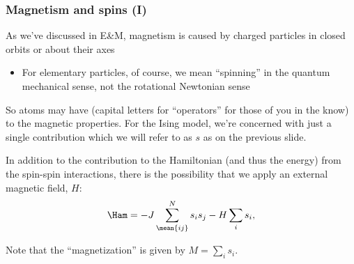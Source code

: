 \documentclass[hyperref={colorlinks=true}]{beamer}
\begin{document}

\begin{frame}%
  \frametitle{Magnetism and spins (I)}

  As we've discussed in E\&M, magnetism is caused by charged particles  in closed orbits or about their axes
  \begin{itemize}
    \item For elementary particles, of course, we mean ``spinning'' in the quantum mechanical sense, not the rotational Newtonian sense
  \end{itemize}
  So atoms may have  (capital letters for ``operators'' for those of you in the know) to the magnetic properties. For the Ising model, we're concerned with just a single contribution which we will refer to as $s$ as on the previous slide.
  
  \vspace{0.3cm}
  
  In addition to the contribution to the Hamiltonian (and thus the energy) from the spin-spin interactions, there is the possibility that we apply an external magnetic field, $H$:
  \begin{equation}
    \Ham = -J \sum_{\mean{ij}}^N s_i s_{j} - H \sum_i s_i , \label{eq:ising-field}
  \end{equation} 

  Note that the ``magnetization'' is given by $M=\sum_i s_i$.

\end{frame}



\end{document}

